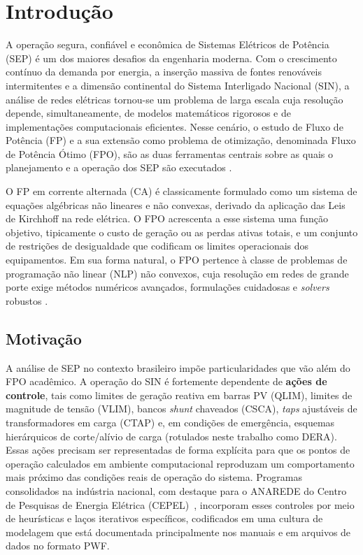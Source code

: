\chapter{Introdução}
\label{cap:introducao}

A operação segura, confiável e econômica de Sistemas Elétricos de Potência (SEP) é um dos maiores desafios da engenharia moderna. Com o crescimento contínuo da demanda por energia, a inserção massiva de fontes renováveis intermitentes e a dimensão continental do Sistema Interligado Nacional (SIN), a análise de redes elétricas tornou-se um problema de larga escala cuja resolução depende, simultaneamente, de modelos matemáticos rigorosos e de implementações computacionais eficientes. Nesse cenário, o estudo de Fluxo de Potência (FP) e a sua extensão como problema de otimização, denominada Fluxo de Potência Ótimo (FPO), são as duas ferramentas centrais sobre as quais o planejamento e a operação dos SEP são executados \cite{vonMeier2006powersystems,gloverSarma2012power}.

O FP em corrente alternada (CA) é classicamente formulado como um sistema de equações algébricas não lineares e não convexas, derivado da aplicação das Leis de Kirchhoff na rede elétrica. O FPO acrescenta a esse sistema uma função objetivo, tipicamente o custo de geração ou as perdas ativas totais, e um conjunto de restrições de desigualdade que codificam os limites operacionais dos equipamentos. Em sua forma natural, o FPO pertence à classe de problemas de programação não linear (NLP) não convexos, cuja resolução em redes de grande porte exige métodos numéricos avançados, formulações cuidadosas e \textit{solvers} robustos \cite{molzahn2019survey}.

\section{Motivação}
\label{sec:motivacao}

A análise de SEP no contexto brasileiro impõe particularidades que vão além do FPO acadêmico. A operação do SIN é fortemente dependente de \textbf{ações de controle}, tais como limites de geração reativa em barras PV (QLIM), limites de magnitude de tensão (VLIM), bancos \textit{shunt} chaveados (CSCA), \textit{taps} ajustáveis de transformadores em carga (CTAP) e, em condições de emergência, esquemas hierárquicos de corte/alívio de carga (rotulados neste trabalho como DERA). Essas ações precisam ser representadas de forma explícita para que os pontos de operação calculados em ambiente computacional reproduzam um comportamento mais próximo das condições reais de operação do sistema. Programas consolidados na indústria nacional, com destaque para o ANAREDE do Centro de Pesquisas de Energia Elétrica (CEPEL)~\cite{cepel2023anarede}, incorporam esses controles por meio de heurísticas e laços iterativos específicos, codificados em uma cultura de modelagem que está documentada principalmente nos manuais e em arquivos de dados no formato PWF.

